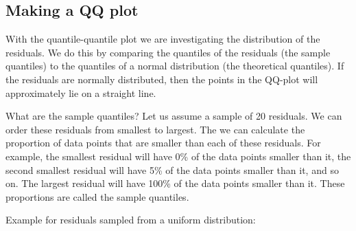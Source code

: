 \documentclass[
  letterpaper,
  8pt,
  a4paper]{book}
\begin{document}
\subsection*{Making a QQ plot}\label{making-a-qq-plot}

With the quantile-quantile plot we are investigating the distribution of
the residuals. We do this by comparing the quantiles of the residuals
(the sample quantiles) to the quantiles of a normal distribution (the
theoretical quantiles). If the residuals are normally distributed, then
the points in the QQ-plot will approximately lie on a straight line.

What are the sample quantiles? Let us assume a sample of 20 residuals.
We can order these residuals from smallest to largest. The we can
calculate the proportion of data points that are smaller than each of
these residuals. For example, the smallest residual will have 0\% of the
data points smaller than it, the second smallest residual will have 5\%
of the data points smaller than it, and so on. The largest residual will
have 100\% of the data points smaller than it. These proportions are
called the sample quantiles.

Example for residuals sampled from a uniform distribution:
\end{document}
